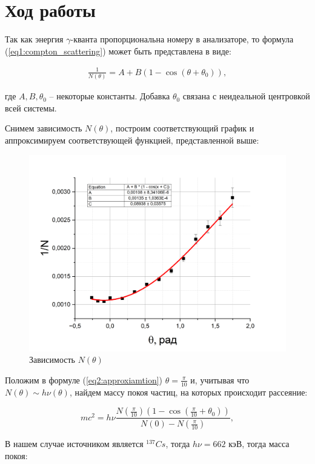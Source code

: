 \documentclass[a4paper,12pt]{article}
\begin{document}
\pagebreak

\section*{Ход работы}

Так как энергия $\gamma$-кванта пропорциональна номеру в анализаторе, то формула (\ref{eq1:compton_scattering}) может быть представлена в виде:

\begin{align} \label{eq2:approxiamtion}
	\frac{1}{N(\theta)} = A + B (1 - \cos (\theta + \theta_0) ),
\end{align}

где $A, B, \theta_0$ -- некоторые константы. Добавка $\theta_0$ связана с неидеальной центровкой всей системы.

Снимем зависимость $N(\theta)$, построим соответствующий график и аппроксимируем соответствующей функцией, представленной выше:

\begin{figure}[h!]
	\centering
	\includegraphics[width=\linewidth]{Chanel_num}
	\caption{Зависимость $N(\theta)$}
\end{figure}

Положим в формуле (\ref{eq2:approxiamtion}) $\theta = \frac{\pi}{10}$ и, учитывая что $N(\theta) \sim h\nu(\theta)$, найдем массу покоя частиц, на которых происходит рассеяние:

$$
	mc^2 = h\nu \frac{N(\frac{\pi}{10}) (1 - \cos (\frac{\pi}{10} + \theta_0) )}{N(0) - N(\frac{\pi}{10})},
$$

В нашем случае источником является $^{137}Cs$, тогда $h\nu = 662$ кэВ, тогда масса покоя:
\end{document}
